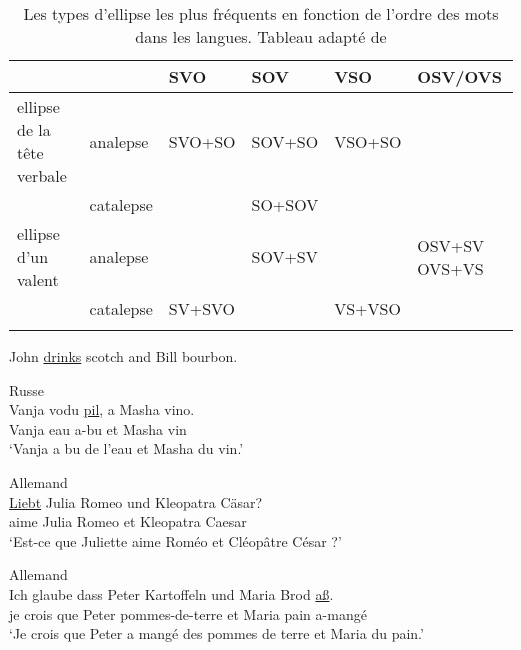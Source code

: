 \begin{table}
\caption{Les types d’ellipse les plus fréquents en fonction de l’ordre des mots dans les langues. Tableau adapté de \citet{Haspelmath2007}}
\label{ch1:tab1}
\small 
\begin{tabularx}{\textwidth}{p{3.5cm}QQQQQ}
\lsptoprule
                           &           & SVO           & SOV            & VSO            & OSV/OVS\\
\midrule
ellipse de la tête verbale & analepse  & SVO+SO\newline {} & SOV+SO\newline {} & VSO+SO\newline {} & \\
                           & catalepse &               & SO+SOV\newline {} &                & \\
\tablevspace
ellipse d’un valent        & analepse  &               & SOV+SV\newline {} &                & OSV+SV  \newline OVS+VS \\
                           & catalepse & SV+SVO\newline {} &               & VS+VSO\newline {} & \\

\lspbottomrule
\end{tabularx} 
\end{table}


  
\ea \label{ch1:ex97}
John \uline{drinks} scotch and Bill bourbon.  
\z

\ea \label{ch1:ex98}
Russe\\
\gll Vanja  vodu  \uline{pil},  a  Masha  vino.\\
Vanja  eau  a-bu  et  Masha  vin\\
\glt ‘Vanja a bu de l’eau et Masha du vin.’ 
\z 


\ea \label{ch1:ex99}
Allemand\\
\gll \uline{Liebt} Julia  Romeo  und  Kleopatra  Cäsar? \\
aime  Julia  Romeo  et  Kleopatra  Caesar\\
\glt ‘Est-ce que Juliette aime Roméo et Cléopâtre César ?’ 
\z


\ea \label{ch1:ex100}
Allemand\\
\gll Ich  glaube  dass  Peter  Kartoffeln  und  Maria  Brod  \uline{aß}. \\
je  crois  que  Peter  pommes-de-terre  et  Maria  pain  a-mangé\\
\glt ‘Je crois que Peter a mangé des pommes de terre et Maria du pain.’ 
\z


